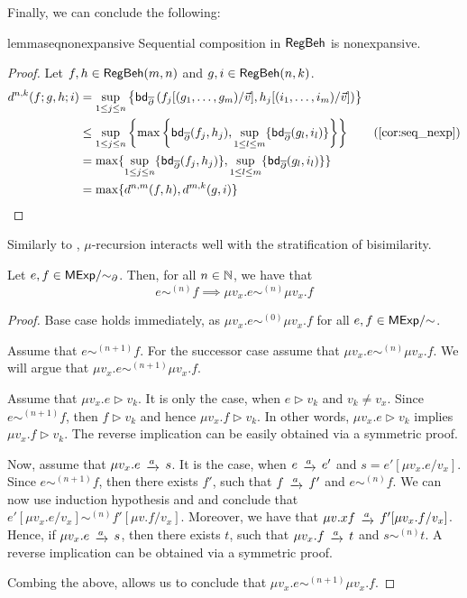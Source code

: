 Finally, we can conclude the following:
\begin{restatable}{lemma}{seqnonexpansive}\label{lem:seq_nonexpansive}
	Sequential composition in $\mathsf{RegBeh}$ is nonexpansive.
\end{restatable}
\begin{proof}
	Let $f,h \in \mathsf{RegBeh}(m,n)$ and $g,i \in \mathsf{RegBeh}(n,k)$. 
	\begin{align*}
		d^{n,k}(f ;g, h;i) &= \sup_{1 \leq j \leq n} \left\{ \mathsf{bd}_{\overline\partial} \left(  f_j[(g_1, \dots, g_m)/\vec{v}], h_j[(i_1, \dots, i_m)/\vec{v}] \right)\right\}\\
		&\leq \sup_{1 \leq j \leq n} \left\{\max \left\{\mathsf{bd}_{\overline\partial} (f_j,h_j), \sup_{ 1 \leq l \leq m} \{\mathsf{bd}_{\overline\partial} (g_l, i_l)\}\right\}\right\} \tag{\Cref{cor:seq_nexp}} \\
		&= \max \{ \sup_{1 \leq j \leq n} \{\mathsf{bd}_{\overline\partial} (f_j,h_j)\}, \sup_{ 1 \leq l \leq m} \{\mathsf{bd}_{\overline\partial} (g_l, i_l)\}\}\\
		&= \max \{d^{n,m}(f,h), d^{m,k}(g,i)\}
	\end{align*}
\end{proof}
Similarly to , $\mu$-recursion interacts well with the stratification of bisimilarity.
\begin{lemma}\label{lem:rec_startified_bisim}
	Let $e, f \in {\mathsf{MExp}}/{\sim_{\partial}}$. Then, for all $n \in \mathbb{N}$, we have that
	$$
	e \sim^{(n)} f \implies \mu v_x. e \sim^{(n)} \mu v_x.f
	$$
\end{lemma}
\begin{proof}
	Base case holds immediately, as $\mu v_x.e \sim^{(0)} \mu v_x.f$ for all $e, f \in {\mathsf{MExp}}/{\sim}$. 
	
	Assume that $e \sim^{(n+1)} f$. For the successor case assume that $\mu v_x . e \sim^{(n)} \mu v_x. f$. We will argue that $\mu v_x . e \sim^{(n+1)} \mu v_x. f$.
	
	Assume that $\mu v_x.e \rhd v_k$. It is only the case, when $e \rhd {v_k}$ and $v_k \neq v_x$. Since $e \sim^{(n+1)} f$, then $f \rhd {v_k}$ and hence $\mu v_x . f \rhd v_k$. In other words, $\mu v_x.e \rhd v_k$ implies $\mu v_x. f \rhd v_k$. The reverse implication can be easily obtained via a symmetric proof.
	
	Now, assume that $\mu v_x.e \tr{a} s$. It is the case, when $e \tr{a} e'$ and $s = e'[\mu v_x.e / v_x]$. Since $e \sim^{(n+1)} f$, then there exists $f'$, such that $f \tr{a} f'$ and $e \sim^{(n)} f$. We can now use induction hypothesis and  and conclude that $e'[\mu v_x. e / v_x] \sim^{(n)} f' [\mu v. f / v_x]$. Moreover, we have that $\mu v.x f \tr{a} f'[\mu v_x.f/v_x]$. Hence, if $\mu v_x.e \tr{a} s$, then there exists $t$, such that $\mu v_x.f \tr{a} t$ and $s \sim^{(n)} t$. A reverse implication can be obtained via a symmetric proof. 
	
	Combing the above, allows us to conclude that $\mu v_x. e \sim^{(n+1)} \mu v_x . f$.
\end{proof}
